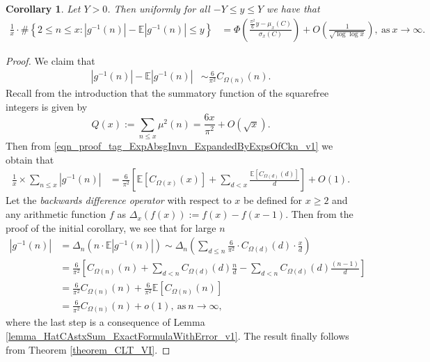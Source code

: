 \documentclass[11pt,reqno,a4letter]{article}
\numberwithin{figure}{section}
\numberwithin{table}{section}
\theoremstyle{plain}
\newtheorem{cor}[theorem]{Corollary}
\numberwithin{theorem}{section}
\theoremstyle{definition}
\begin{document}
\begin{cor} 
\label{cor_CLT_VII} 
Let $Y > 0$. 
Then uniformly for all $-Y \leq y \leq Y$ 
we have that 
\begin{align*} 
\frac{1}{x} \cdot \#\left\{2 \leq n \leq x:|g^{-1}(n)| - 
     \mathbb{E}|g^{-1}(n)| \leq y\right\} & = 
     \Phi\left(\frac{\frac{\pi^2}{6} y - \mu_x(C)}{\sigma_x(C)}\right) + 
     O\left(\frac{1}{\sqrt{\log\log x}}\right), 
     \mathrm{\ as\ } x \rightarrow \infty. 
\end{align*} 
\end{cor} 
\begin{proof} 
We claim that 
\begin{align*} 
|g^{-1}(n)| - \mathbb{E}|g^{-1}(n)| & \sim \frac{6}{\pi^2} C_{\Omega(n)}(n). 
\end{align*} 
Recall from the introduction that the summatory function of the 
squarefree integers is given by 
\[
Q(x) := \sum_{n \leq x} \mu^2(n) = \frac{6x}{\pi^2} + O(\sqrt{x}). 
\]
Then from \eqref{eqn_proof_tag_ExpAbsgInvn_ExpandedByExpsOfCkn_v1}
we obtain that 
\begin{align*} 
\frac{1}{x} \times \sum_{n \leq x} |g^{-1}(n)| & = 
     \frac{6}{\pi^2} \left[\mathbb{E}[C_{\Omega(x)}(x)] + \sum_{d<x} 
     \frac{\mathbb{E}[C_{\Omega(d)}(d)]}{d}\right] + O(1). 
\end{align*} 
Let the \emph{backwards difference operator} with respect to $x$ 
be defined for $x \geq 2$ and any arithmetic function $f$ as 
$\Delta_x(f(x)) := f(x) - f(x-1)$. Then from the proof of the initial corollary, 
we see that for large $n$ 
\begin{align*} 
|g^{-1}(n)| & = \Delta_n(n \cdot \mathbb{E}|g^{-1}(n)|) 
     \sim \Delta_n\left(\sum_{d \leq n} \frac{6}{\pi^2} \cdot C_{\Omega(d)}(d) \cdot \frac{x}{d}\right) \\ 
     & = \frac{6}{\pi^2}\left[C_{\Omega(n)}(n) + \sum_{d < n} C_{\Omega(d)}(d) \frac{n}{d} - 
     \sum_{d<n} C_{\Omega(d)}(d) \frac{(n-1)}{d}\right] \\ 
     & = \frac{6}{\pi^2} C_{\Omega(n)}(n) + \frac{6}{\pi^2} \mathbb{E}[C_{\Omega(n)}(n)] \\ 
     & = \frac{6}{\pi^2} C_{\Omega(n)}(n) + o(1), 
     \mathrm{\ as\ } n \rightarrow \infty, 
\end{align*} 
where the last step is a consequence of 
Lemma \ref{lemma_HatCAstxSum_ExactFormulaWithError_v1}. 
The result finally follows from Theorem \ref{theorem_CLT_VI}. 
\end{proof} 
\end{document}
